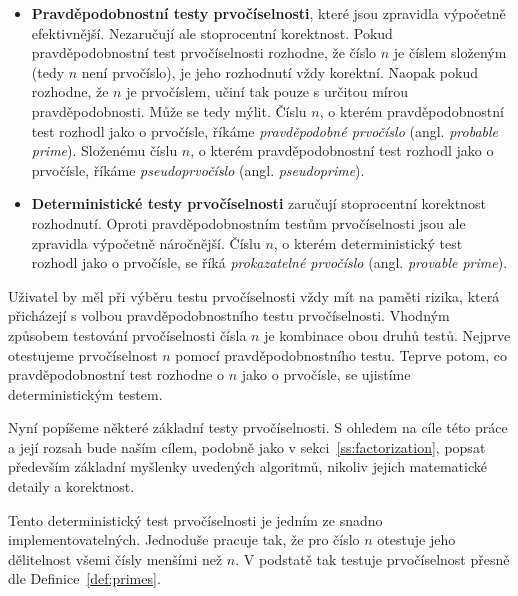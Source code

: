 \documentclass[
  program=infoi,
  biblatex=false,
  figures=true,
  glossaries,
  tables=false,
  sourcecodes=true,
  index
]{kidiplom}
\begin{document}
        \begin{itemize}
            \item 
                \textbf{Pravděpodobnostní testy prvočíselnosti}, které jsou zpravidla výpočetně efektivnější.
                Nezaručují ale stoprocentní korektnost.
                Pokud pravděpodobnostní test prvočíselnosti rozhodne, že číslo $n$ je číslem složeným (tedy $n$ není prvočíslo),
                je jeho rozhodnutí vždy korektní.
                Naopak pokud rozhodne, že $n$ je prvočíslem, učiní tak pouze s určitou mírou pravděpodobnosti.
                Může se tedy mýlit.
                Číslu $n$, o kterém pravděpodobnostní test rozhodl jako o prvočísle,
                říkáme \emph{pravděpodobné prvočíslo} (angl. \emph{probable prime}).
                Složenému číslu $n$, o kterém pravděpodobnostní test rozhodl jako o prvočísle, říkáme \emph{pseudoprvočíslo} (angl. \emph{pseudoprime}).
                
            \item
                \textbf{Deterministické testy prvočíselnosti} zaručují stoprocentní korektnost rozhodnutí.
                Oproti pravděpodobnostním testům prvočíselnosti jsou ale zpravidla výpočetně náročnější.
                Číslu $n$, o kterém deterministický test rozhodl jako o prvočísle, se říká \emph{prokazatelné prvočíslo} (angl. \emph{provable prime}).
        \end{itemize}
        
        Uživatel by měl při výběru testu prvočíselnosti vždy mít na paměti rizika, která
        přicházejí s volbou pravděpodobnostního testu prvočíselnosti.
        Vhodným způsobem testování prvočíselnosti čísla $n$ je kombinace obou druhů testů.
        Nejprve otestujeme prvočíselnost $n$ pomocí pravděpodobnostního testu.
        Teprve potom, co pravděpodobnostní test rozhodne o $n$ jako o prvočísle, se ujistíme deterministickým testem.

        Nyní popíšeme některé základní testy prvočíselnosti.
        S ohledem na cíle této práce a její rozsah bude naším cílem, podobně jako v sekci~\ref{ss:factorization}, popsat především
        základní myšlenky uvedených algoritmů, nikoliv jejich matematické detaily a korektnost.


        \label{sss:trial-division-primality}

            Tento deterministický test prvočíselnosti je jedním ze snadno implementovatelných.
            Jednoduše pracuje tak, že pro číslo $n$ otestuje jeho dělitelnost všemi čísly menšími než $n$.
            V podstatě tak testuje prvočíselnost přesně dle Definice~\ref{def:primes}.
\end{document}
